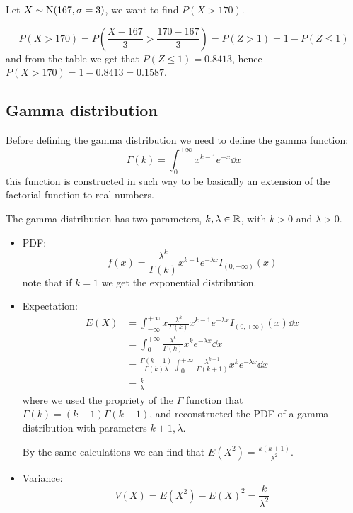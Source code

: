 \documentclass[14pt]{extarticle}
\newcommand{\Normal}{{\operatorfont N}}
\begin{document}
\begin{example}
    Let $X \sim \Normal(167, \sigma = 3)$, we want to find $P(X > 170)$.

    \begin{equation}
        P(X>170) = P(\frac{X - 167}{3} > \frac{170 - 167}{3}) = P(Z > 1) = 1 - P(Z \leq 1)
    \end{equation}
    and from the table we get that $P(Z \leq 1) = 0.8413$, hence $P(X > 170) = 1 - 0.8413 = 0.1587$.
\end{example}

\subsection{Gamma distribution}

Before defining the gamma distribution we need to define the gamma function:
\begin{equation}
    \Gamma(k) = \int_0^{+\infty}x^{k-1}e^{-x} \dd{x}
\end{equation}
this function is constructed in such way to be basically an extension of the factorial function to real numbers.

The gamma distribution has two parameters, $k, \lambda \in \mathbb{R}$, with $k > 0$ and $\lambda > 0$.

\begin{itemize}
    \item PDF:
          \begin{equation}
              f(x) = \frac{\lambda^k}{\Gamma(k)} x^{k-1} e^{-\lambda x} I_{(0, +\infty)}(x)
          \end{equation}
          note that if $k = 1$ we get the exponential distribution.
    \item Expectation:
          \begin{align}
              E(X) & = \int_{-\infty}^{+\infty} x \frac{\lambda^k}{\Gamma(k)} x^{k-1} e^{-\lambda x} I_{(0, +\infty)}(x) \dd{x}               \\
                   & = \int_{0}^{+\infty} \frac{\lambda^k}{\Gamma(k)} x^{k} e^{-\lambda x} \dd{x}                                             \\
                   & = \frac{\Gamma(k+1)}{\Gamma(k) \lambda} \int_{0}^{+\infty} \frac{\lambda^{k+1}}{\Gamma(k+1)} x^{k} e^{-\lambda x} \dd{x} \\
                   & = \frac{k}{\lambda}
          \end{align}
          where we used the propriety of the $\Gamma$ function that $\Gamma(k) = (k-1) \Gamma(k-1)$, and reconstructed the PDF of a gamma distribution with parameters $k+1, \lambda$.

          By the same calculations we can find that $E(X^2) = \frac{k(k+1)}{\lambda^2}$.

    \item Variance:
          \begin{equation}
              V(X) = E(X^2) - E(X)^2 = \frac{k}{\lambda^2}
          \end{equation}
\end{itemize}
\end{document}
